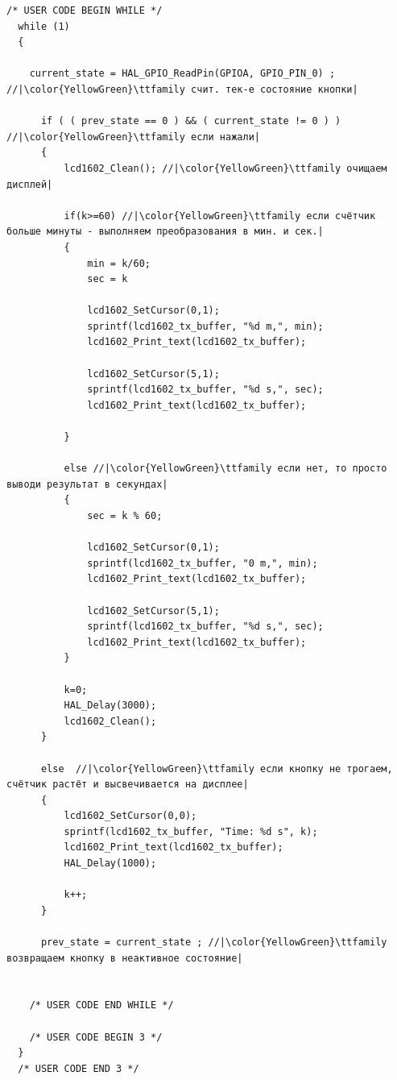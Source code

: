 \documentclass[14pt,a4paper]{scrartcl}
\begin{document}
\begin{lstlisting}
/* USER CODE BEGIN WHILE */
  while (1)
  {

	current_state = HAL_GPIO_ReadPin(GPIOA, GPIO_PIN_0) ; //|\color{YellowGreen}\ttfamily счит. тек-е состояние кнопки|

	  if ( ( prev_state == 0 ) && ( current_state != 0 ) ) //|\color{YellowGreen}\ttfamily если нажали|
	  {
		  lcd1602_Clean(); //|\color{YellowGreen}\ttfamily очищаем дисплей|

		  if(k>=60) //|\color{YellowGreen}\ttfamily если счётчик больше минуты - выполняем преобразования в мин. и сек.|
		  {
			  min = k/60;
			  sec = k

			  lcd1602_SetCursor(0,1);
			  sprintf(lcd1602_tx_buffer, "%d m,", min);
			  lcd1602_Print_text(lcd1602_tx_buffer);

			  lcd1602_SetCursor(5,1);
			  sprintf(lcd1602_tx_buffer, "%d s,", sec);
			  lcd1602_Print_text(lcd1602_tx_buffer);

		  }

		  else //|\color{YellowGreen}\ttfamily если нет, то просто выводи результат в секундах|  
		  {
			  sec = k % 60;

			  lcd1602_SetCursor(0,1);
			  sprintf(lcd1602_tx_buffer, "0 m,", min);
			  lcd1602_Print_text(lcd1602_tx_buffer);

			  lcd1602_SetCursor(5,1);
			  sprintf(lcd1602_tx_buffer, "%d s,", sec);
			  lcd1602_Print_text(lcd1602_tx_buffer);
		  }

		  k=0;
		  HAL_Delay(3000);
		  lcd1602_Clean();
	  }

	  else  //|\color{YellowGreen}\ttfamily если кнопку не трогаем, счётчик растёт и высвечивается на дисплее|
	  {
		  lcd1602_SetCursor(0,0);
		  sprintf(lcd1602_tx_buffer, "Time: %d s", k);
		  lcd1602_Print_text(lcd1602_tx_buffer);
		  HAL_Delay(1000);

		  k++;
	  }

	  prev_state = current_state ; //|\color{YellowGreen}\ttfamily возвращаем кнопку в неактивное состояние|


    /* USER CODE END WHILE */

    /* USER CODE BEGIN 3 */
  }
  /* USER CODE END 3 */
\end{lstlisting}













\end{document}
